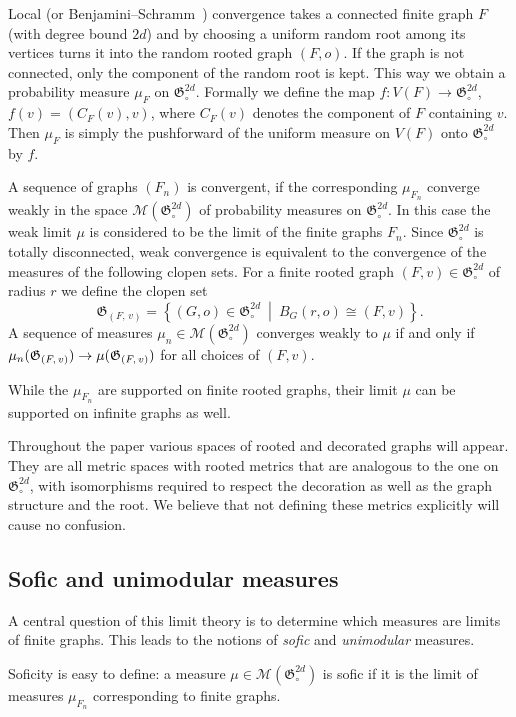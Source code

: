 \documentclass[11pt]{article}
\theoremstyle{definition}
\numberwithin{equation}{section}
\numberwithin{figure}{section}
\numberwithin{table}{section}
\newcommand{\clM}{\mathcal{M}}
\newcommand{\GoG}{\mathfrak{G}}
\begin{document}
Local (or Benjamini--Schramm~\cite{benjamini2001}) convergence takes a connected finite graph $F$ (with degree bound $2d$) and by choosing a uniform random root among its vertices turns it into the random rooted graph $(F,o)$. If the graph is not connected, only the component of the random root is kept. This way we obtain a probability measure $\mu_F$ on $\GoG_{\circ}^{2d}$. Formally we define the map $f:V(F) \to \GoG_{\circ}^{2d}$, $f(v) = (C_F(v),v)$, where $C_F(v)$ denotes the component of $F$ containing $v$. Then $\mu_F$ is simply the pushforward of the uniform measure on $V(F)$ onto $\GoG_{\circ}^{2d}$ by $f$.

A sequence of graphs $(F_n)$ is convergent, if the corresponding $\mu_{F_n}$ converge weakly in the space $\clM(\GoG_{\circ}^{2d})$ of probability measures on $\GoG_{\circ}^{2d}$. In this case the weak limit $\mu$ is considered to be the limit of the finite graphs $F_n$. Since $\GoG_{\circ}^{2d}$ is totally disconnected, weak convergence is equivalent to the convergence of the measures of the following clopen sets. For a finite rooted graph $(F,v) \in \GoG_{\circ}^{2d}$ of radius $r$ we define the clopen set
\[
\GoG_{(F,\,v)}=\left\{(G,o) \in \GoG_{\circ}^{2d}~\middle|~B_{G}(r,o) \cong (F,v)\right\}.
\]
A sequence of measures $\mu_n \in \clM(\GoG_{\circ}^{2d})$ converges weakly to $\mu$ if and only if $\mu_n(\GoG_{(F,\,v)})\linebreak\to \mu(\GoG_{(F,\,v)})$ for all choices of $(F,v)$.

While the $\mu_{F_n}$ are supported on finite rooted graphs, their limit $\mu$ can be supported on infinite graphs as well.

Throughout the paper various spaces of rooted and decorated graphs will appear. They are all metric spaces with rooted metrics that are analogous to the one on $\GoG_{\circ}^{2d}$, with isomorphisms required to respect the decoration as well as the graph structure and the root. We believe that not defining these metrics explicitly will cause no confusion.


\subsection{Sofic and unimodular measures}
A central question of this limit theory is to determine which measures are limits of finite graphs. This leads to the notions of \emph{sofic} and \emph{unimodular} measures.

Soficity is easy to define: a measure $\mu \in \clM(\GoG_{\circ}^{2d})$ is sofic if it is the limit of measures $\mu_{F_n}$ corresponding to finite graphs.
\end{document}
